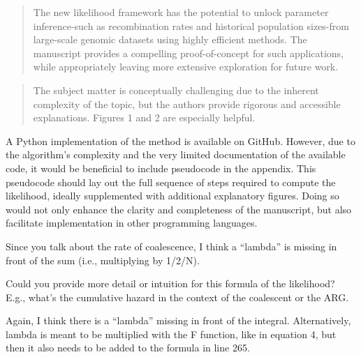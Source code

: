 \begin{quote}
The new likelihood framework has the potential to unlock parameter inference-such as recombination rates and historical population sizes-from large-scale genomic datasets using highly efficient methods. The manuscript provides a compelling proof-of-concept for such applications, while appropriately leaving more extensive exploration for future work.
\end{quote}

\begin{quote}
The subject matter is conceptually challenging due to the inherent complexity of the topic, but the authors provide rigorous and accessible explanations. Figures 1 and 2 are especially helpful.
\end{quote}

\begin{point}{}
A Python implementation of the method is available on GitHub. However, due to the algorithm's complexity and the very limited documentation of the available code, it would be beneficial to include pseudocode in the appendix. This pseudocode should lay out the full sequence of steps required to compute the likelihood, ideally supplemented with additional explanatory figures. Doing so would not only enhance the clarity and completeness of the manuscript, but also facilitate implementation in other programming languages.
\end{point}

\reply{
}


\begin{point}{\revref} %
 Since you talk about the rate of coalescence, I think a ``lambda'' is missing in front of the sum (i.e., multiplying by 1/2/N).
\end{point}

\reply{
}

\begin{point}{\revref} %
 Could you provide more detail or intuition for this formula of the likelihood? E.g., what's the cumulative hazard in the context of the coalescent or the ARG.
\end{point}

\reply{
}

\begin{point}{\revref} %
 Again, I think there is a ``lambda'' missing in front of the integral. Alternatively, lambda is meant to be multiplied with the F function, like in equation 4, but then it also needs to be added to the formula in line 265.
\end{point}

